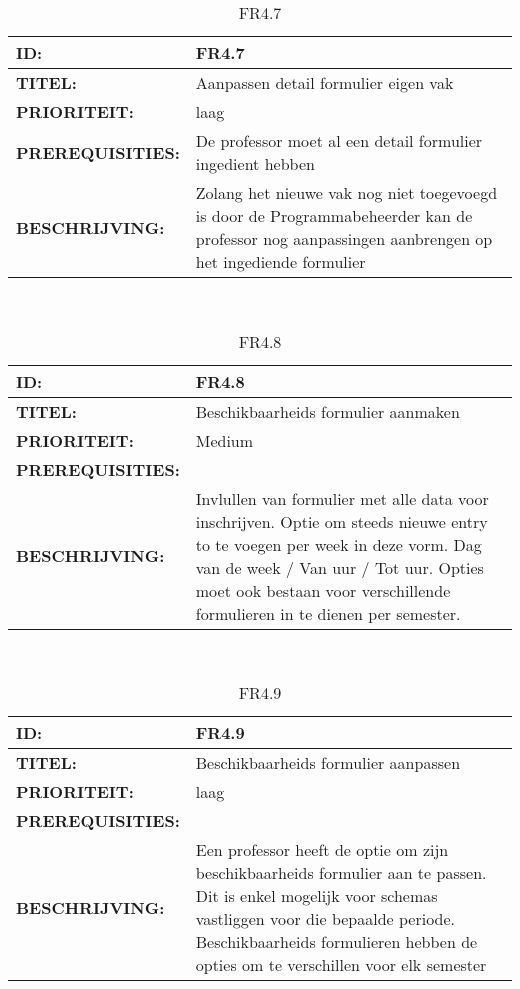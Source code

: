 \noindent\begin{table}[h]
            \begin{tabular}{l | p{10cm}}
                \textbf{ID:} & FR4.7 \\ \hline
                \textbf{TITEL:} & Aanpassen detail formulier eigen vak \\ \hline
                \textbf{PRIORITEIT:} &  laag \\ \hline
                \textbf{PREREQUISITIES:} & De professor moet al een detail formulier ingedient hebben\\ \hline
                \textbf{BESCHRIJVING:} & Zolang het nieuwe vak nog niet toegevoegd is door de Programmabeheerder kan de professor nog aanpassingen aanbrengen op het ingediende formulier\\ 
            \end{tabular}\\
            \caption{FR4.7}
            \label{tab:FR4.7}
        \end{table}
        
\noindent\begin{table}[h]
            \begin{tabular}{l | p{10cm}}
                \textbf{ID:} & FR4.8 \\ \hline
                \textbf{TITEL:} & Beschikbaarheids formulier aanmaken \\ \hline
                \textbf{PRIORITEIT:} &  Medium \\ \hline
                \textbf{PREREQUISITIES:} & \\ \hline
                \textbf{BESCHRIJVING:} & 
                Invlullen van formulier met alle data voor inschrijven. Optie om steeds nieuwe entry to te voegen per week in deze vorm. Dag van de week / Van uur / Tot uur. Opties moet ook bestaan voor verschillende formulieren in te dienen per semester.\\
            \end{tabular}\\
            \caption{FR4.8}
            \label{tab:FR4.8}
        \end{table}
        
\noindent\begin{table}[h]
            \begin{tabular}{l | p{10cm}}
                \textbf{ID:} & FR4.9 \\ \hline
                \textbf{TITEL:} & Beschikbaarheids formulier aanpassen \\ \hline
                \textbf{PRIORITEIT:} &  laag \\ \hline
                \textbf{PREREQUISITIES:} & \\ \hline
                \textbf{BESCHRIJVING:} & Een professor heeft de optie om zijn beschikbaarheids formulier aan te passen. Dit is enkel mogelijk voor schemas vastliggen voor die bepaalde periode. Beschikbaarheids formulieren hebben de opties om te verschillen voor elk semester\\ 
            \end{tabular}\\
            \caption{FR4.9}
            \label{tab:FR4.9}
        \end{table}
        
